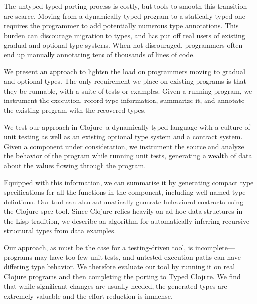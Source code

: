 %


The untyped-typed porting process is costly, but tools to smooth
this transition are scarce.  Moving from a dynamically-typed program
to a statically typed one requires the programmer to add potentially
numerous type annotations. This burden can discourage migration to
types, and has put off real users of existing gradual and optional
type systems. When not discouraged, programmers often end up
manually annotating tens of thousands of lines of code.

We present an approach to lighten the load on programmers moving to
gradual and optional types. The only requirement we place on existing
programs is that they be runnable, with a suite of tests or
examples. Given a running program, we instrument the execution, record
type information, summarize it, and annotate the existing program with
the recovered types.

We test our approach in Clojure, a dynamically typed
language with a culture of unit testing as well as an  existing
optional type system and a contract system. Given a component under
consideration, we instrument the source and analyze the behavior of the
program while running unit tests, generating a wealth of data about
the values flowing through the program.

Equipped with this information, we can summarize it by generating compact
type specifications for all the functions in the component, including
well-named type defintions. Our tool can also automatically generate
behavioral contracts using the Clojure spec tool. Since Clojure relies
heavily on ad-hoc data structures in the Lisp tradition, we describe
an algorithm for automatically inferring recursive structural types
from data examples.

Our approach, as must be the case for a testing-driven tool, is
incomplete---programs may have too few unit tests, and untested
execution paths can have differing type behavior. We therefore
evaluate our tool by running it on real Clojure programs and then
completing the porting to Typed Clojure. We find that while
significant changes are usually needed, the generated types are
extremely valuable and the effort reduction is immense.

